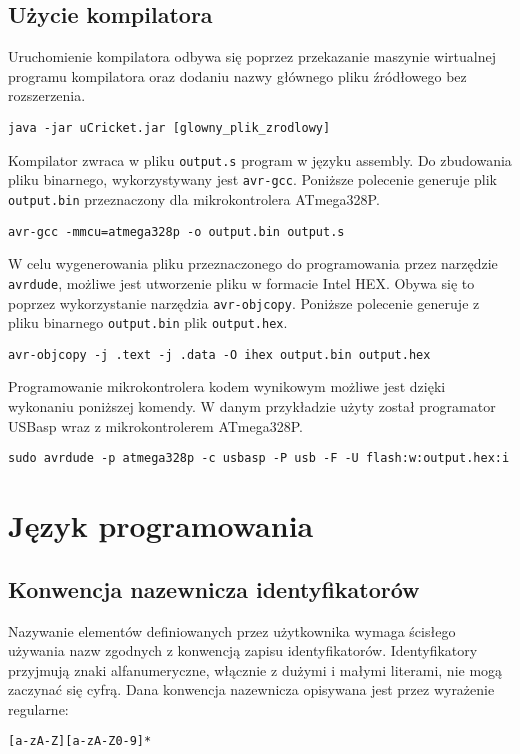 \subsection{Użycie kompilatora}
Uruchomienie kompilatora odbywa się poprzez przekazanie maszynie wirtualnej programu kompilatora oraz dodaniu nazwy głównego pliku źródłowego bez rozszerzenia.
\begin{lstlisting}
java -jar uCricket.jar [glowny_plik_zrodlowy]
\end{lstlisting}
Kompilator zwraca w pliku \lstinline|output.s|  program w języku assembly. Do zbudowania pliku binarnego, wykorzystywany jest \lstinline|avr-gcc|. Poniższe polecenie generuje plik \lstinline|output.bin| przeznaczony dla mikrokontrolera ATmega328P.
\begin{lstlisting}
avr-gcc -mmcu=atmega328p -o output.bin output.s
\end{lstlisting}
W celu wygenerowania pliku przeznaczonego do programowania przez narzędzie \lstinline|avrdude|, możliwe jest utworzenie pliku w formacie Intel HEX. Obywa się to poprzez wykorzystanie narzędzia \lstinline|avr-objcopy|. Poniższe polecenie generuje z pliku binarnego \lstinline|output.bin| plik \lstinline|output.hex|.
\begin{lstlisting}
avr-objcopy -j .text -j .data -O ihex output.bin output.hex
\end{lstlisting}
Programowanie mikrokontrolera kodem wynikowym możliwe jest dzięki wykonaniu poniższej komendy. W danym przykładzie użyty został programator USBasp wraz z mikrokontrolerem ATmega328P.
\begin{lstlisting}
sudo avrdude -p atmega328p -c usbasp -P usb -F -U flash:w:output.hex:i
\end{lstlisting}

\section{Język programowania}
\subsection{Konwencja nazewnicza identyfikatorów}
Nazywanie elementów definiowanych przez użytkownika wymaga ścisłego używania nazw zgodnych z konwencją zapisu identyfikatorów. Identyfikatory przyjmują znaki alfanumeryczne, włącznie z dużymi i małymi literami, nie mogą zaczynać się cyfrą.  Dana konwencja nazewnicza opisywana jest przez wyrażenie regularne:
\begin{lstlisting}
[a-zA-Z][a-zA-Z0-9]*
\end{lstlisting}

